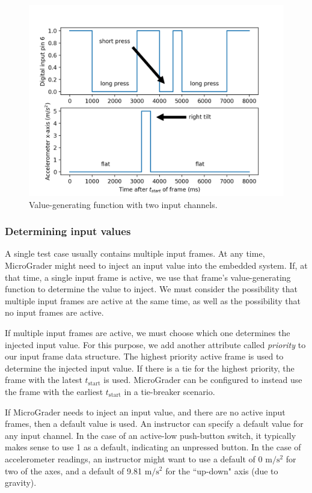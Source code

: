 \documentclass[12pt]{article}
\begin{document}
\begin{figure}[h]
\centering
\includegraphics[scale=1]{wiki-frame.png}
\caption{Value-generating function with two input channels.}
\label{fig:value-gen}
\end{figure}

\subsubsection{Determining input values}
A single test case usually contains multiple input frames.  At any time, MicroGrader might need to inject an input value into the embedded system.  If, at that time, a single input frame is active, we use that frame's value-generating function to determine the value to inject.  We must consider the possibility that multiple input frames are active at the same time, as well as the possibility that no input frames are active.

If multiple input frames are active, we must choose which one determines the injected input value.  For this purpose, we add another attribute called \textit{priority} to our input frame data structure.  The highest priority active frame is used to determine the injected input value.  If there is a tie for the highest priority, the frame with the latest $t_{\text{start}}$ is used.  MicroGrader can be configured to instead use the frame with the earliest $t_{\text{start}}$ in a tie-breaker scenario.

If MicroGrader needs to inject an input value, and there are no active input frames, then a default value is used.  An instructor can specify a default value for any input channel.  In the case of an active-low push-button switch, it typically makes sense to use 1 as a default, indicating an unpressed button.  In the case of accelerometer readings, an instructor might want to use a default of 0 $\text{m}/\text{s}^2$ for two of the axes, and a default of 9.81 $\text{m}/\text{s}^2$ for the ``up-down" axis (due to gravity).
\end{document}
